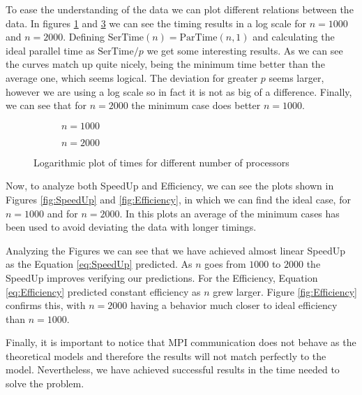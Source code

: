\documentclass[a4paper]{article}
\begin{document}
    To ease the understanding of the data we can plot different relations between the data. In figures \ref{fig:1000} and \ref{fig:2000} we can see the timing results in a log scale for $n = 1000$ and $n = 2000$. Defining $\text{SerTime}(n) = \text{ParTime}(n,1)$ and calculating the ideal parallel time as $\text{SerTime}/p$ we get some interesting results. As we can see the curves match up quite nicely, being the minimum time better than the average one, which seems logical. The deviation for greater $p$ seems larger, however we are using a log scale so in fact it is not as big of a difference. Finally, we can see that for $n = 2000$ the minimum case does better $n = 1000$.

    \begin{figure}[htp!]
      \centering
      \begin{subfigure}{.5\textwidth}
        \centering
        \caption{$n = 1000$}
        \label{fig:1000}
      \end{subfigure}%
      \begin{subfigure}{.5\textwidth}
        \centering
        \caption{$n = 2000$}
        \label{fig:2000}
      \end{subfigure}
      \caption{Logarithmic plot of times for different number of processors}
    \end{figure}

    Now, to analyze both SpeedUp and Efficiency, we can see the plots shown in Figures \ref{fig:SpeedUp} and \ref{fig:Efficiency}, in which we can find the ideal case, for $n = 1000$ and for $n = 2000$. In this plots an average of the minimum cases has been used to avoid deviating the data with longer timings.

    Analyzing the Figures we can see that we have achieved almost linear SpeedUp as the Equation \eqref{eq:SpeedUp} predicted. As $n$ goes from $1000$ to $2000$ the SpeedUp improves verifying our predictions. For the Efficiency, Equation \eqref{eq:Efficiency} predicted constant efficiency as $n$ grew larger. Figure \ref{fig:Efficiency} confirms this, with $n = 2000$ having a behavior much closer to ideal efficiency than $n = 1000$.

    Finally, it is important to notice that MPI communication does not behave as the theoretical models and therefore the results will not match perfectly to the model. Nevertheless, we have achieved successful results in the time needed to solve the problem.
\end{document}
